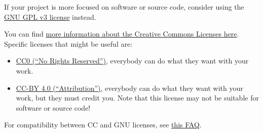 \documentclass[
]{book}
\providecommand{\tightlist}{%
  \setlength{\itemsep}{0pt}\setlength{\parskip}{0pt}}
\begin{document}
If your project is more focused on software or source code, consider using the \href{https://www.gnu.org/licenses/gpl-3.0.en.html}{GNU GPL v3 license} instead.

You can find \href{https://creativecommons.org/share-your-work/licensing-examples}{more information about the Creative Commons Licenses here}. Specific licenses that might be useful are:

\begin{itemize}
\tightlist
\item
  \href{https://creativecommons.org/share-your-work/public-domain/cc0/}{CC0 (``No Rights Reserved'')}, everybody can do what they want with your work.
\item
  \href{https://creativecommons.org/licenses/by/4.0/}{CC-BY 4.0 (``Attribution'')}, everybody can do what they want with your work, but they must credit you. Note that this license may not be suitable for software or source code!
\end{itemize}

For compatibility between CC and GNU licenses, see \href{https://creativecommons.org/faq/\#Can_I_apply_a_Creative_Commons_license_to_software.3F}{this FAQ}.

  
\end{document}
